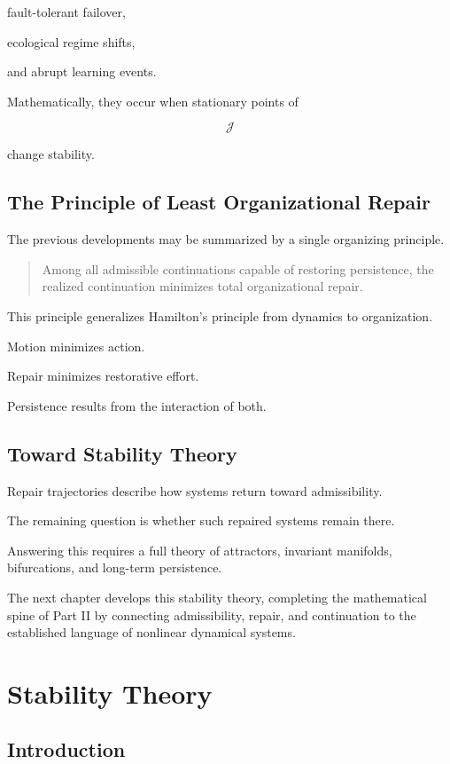 \documentclass[11pt,oneside]{book}
\numberwithin{equation}{chapter}
\theoremstyle{definition}
\theoremstyle{plain}
\begin{document}
fault-tolerant failover,

ecological regime shifts,

and abrupt learning events.

Mathematically, they occur when stationary points of

\[
\mathcal J
\]

change stability.

\section{The Principle of Least Organizational Repair}

The previous developments may be summarized by a single organizing
principle.

\begin{quote}

Among all admissible continuations capable of restoring persistence, the
realized continuation minimizes total organizational repair.

\end{quote}

This principle generalizes Hamilton's principle from dynamics to
organization.

Motion minimizes action.

Repair minimizes restorative effort.

Persistence results from the interaction of both.

\section{Toward Stability Theory}

Repair trajectories describe how systems return toward admissibility.

The remaining question is whether such repaired systems remain there.

Answering this requires a full theory of attractors, invariant manifolds,
bifurcations, and long-term persistence.

The next chapter develops this stability theory, completing the
mathematical spine of Part II by connecting admissibility, repair, and
continuation to the established language of nonlinear dynamical systems.

\chapter{Stability Theory}

\section{Introduction}
\end{document}
